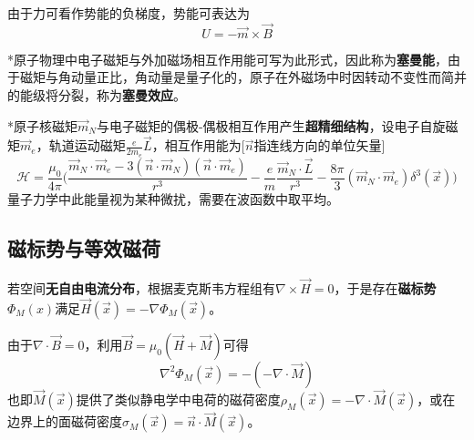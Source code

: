 \documentclass[a4paper,UTF8,fontset=windows]{ctexart}
\newcommand*{\vb}{\vec{B}}
\newcommand*{\vh}{\vec{H}}
\newcommand*{\vl}{\vec{L}}
\newcommand*{\vm}{\vec{M}}
\newcommand*{\vms}{\vec{m}}
\newcommand*{\vns}{\vec{n}}
\newcommand*{\vx}{\vec{x}}
\begin{document}
由于力可看作势能的负梯度，势能可表达为
$$U=-\vms\times\vb$$

*原子物理中电子磁矩与外加磁场相互作用能可写为此形式，因此称为\textbf{塞曼能}，由于磁矩与角动量正比，角动量是量子化的，原子在外磁场中时因转动不变性而简并的能级将分裂，称为\textbf{塞曼效应}。

*原子核磁矩$\vms_N$与电子磁矩的偶极-偶极相互作用产生\textbf{超精细结构}，设电子自旋磁矩$\vms_e$，轨道运动磁矩$\frac{e}{2m_e}\vl$，相互作用能为[$\vns$指连线方向的单位矢量]
$$\mathcal{H}=\frac{\mu_0}{4\pi}\bigg(\frac{\vms_N\cdot\vms_e-3(\vns\cdot\vms_N)(\vns\cdot\vms_e)}{r^3}-\frac{e}{m}\frac{\vms_N\cdot\vl}{r^3}-\frac{8\pi}{3}(\vms_N\cdot\vms_e)\delta^3(\vx)\bigg)$$
量子力学中此能量视为某种微扰，需要在波函数中取平均。

\subsection{磁标势与等效磁荷}
若空间\textbf{无自由电流分布}，根据麦克斯韦方程组有$\nabla\times\vh=0$，于是存在\textbf{磁标势}$\Phi_M(x)$满足$\vh(\vx)=-\nabla\Phi_M(\vx)$。

由于$\nabla\cdot\vb=0$，利用$\vb=\mu_0(\vh+\vm)$可得
$$\nabla^2\Phi_M(\vx)=-(-\nabla\cdot\vm)$$
也即$\vm(\vx)$提供了类似静电学中电荷的磁荷密度$\rho_M(\vx)=-\nabla\cdot\vm(\vx)$，或在边界上的面磁荷密度$\sigma_M(\vx)=\vns\cdot\vm(\vx)$。
\end{document}

